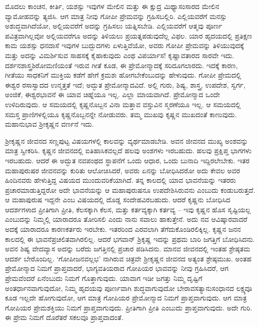 ಮೊದಲು ಕಾಂಚನ, ಕೀರ್ತಿ, ಯಶಸ್ಸು ಇವುಗಳ ಮೇಲಿನ ಮತ್ತು ಈ ಕ್ಷುದ್ರ ಮಿಥ್ಯಾಸಂಸಾರದ ಮೇಲಿನ ವ್ಯಾಮೋಹವನ್ನು ತ್ಯಜಿಸಿ. ಆಗ ಮಾತ್ರ ನೀವು ಗೋಪೀ ಪ್ರೇಮವನ್ನು ಗ್ರಹಿಸಬಲ್ಲಿರಿ. ಎಲ್ಲಿಯವರೆಗೆ ಮನಸ್ಸು ಅಶುದ್ಧವಾಗಿದೆಯೋ, ಅಲ್ಲಿಯವರೆಗೆ ಅದನ್ನು ಗ್ರಹಿಸಲು ಯತ್ನಿಸಬೇಡಿ. ಎಲ್ಲಿಯವರೆಗೆ ಆತ್ಮವು ಪೂರ್ಣ ಪವಿತ್ರವಾಗಿಲ್ಲವೋ ಅಲ್ಲಿಯವರೆಗೂ ಅದನ್ನು ತಿಳಿಯಲು ಪ್ರಯತ್ನಪಡುವುದೆಲ್ಲ ವಿಫಲ. ಯಾರ ಹೃದಯದಲ್ಲಿ ಪ್ರತಿಕ್ಷಣ ಕಾಮ ಯಶಸ್ಸು ಧನದಾಸೆ ಇವುಗಳ ಬುದ್ಬುದಗಳು ಏಳುತ್ತಿವೆಯೋ, ಅವರು ಗೋಪೀ ಪ್ರೇಮವನ್ನು ತಿಳಿಯುವುದಕ್ಕೆ ಮತ್ತು ಅದನ್ನು ವಿಮರ್ಶಿಸುವ ಸಾಹಸಕ್ಕೆ ಕೈಹಾಕುವುದು ಎಂಥ ವಿಪರ್ಯಾಸ! ಕೃಷ್ಣಾವತಾರದ ಸಾರವೇ ಇದು. ದರ್ಶನಶಾಸ್ತ್ರಶಿರೋಮಣಿಯಂತೆ ಇರುವ ಗೀತೆ ಕೂಡ, ಈ ಪ್ರೇಮೋನ್ಮಾದಕ್ಕೆ ಸರಿದೂಗಲಾರದು. ಇದಕ್ಕೆ ಕಾರಣ, ಗೀತೆಯು ಸಾಧಕನಿಗೆ ಮುಕ್ತಿಯ ಕಡೆಗೆ ಹೇಗೆ ಕ್ರಮಶಃ ಹೋಗಬೇಕೆಂಬುದನ್ನು ಹೇಳುವುದು. ಗೋಪೀ ಪ್ರೇಮದಲ್ಲಿ ಈಶ್ವರ ರಸಾಸ್ವಾದದ ಉನ್ಮತ್ತತೆ ಇದೆ; ಅದ್ಭುತ ಪ್ರೇಮೋನ್ಮಾದವಿದೆ. ಅಲ್ಲಿ ಗುರು, ಶಿಷ್ಯ, ಶಾಸ್ತ್ರ, ಉಪದೇಶ, ಸ್ವರ್ಗ, ಅಂಜಿಕೆ, ಈಶ್ವರಭಾವನೆ ಈ ಯಾವ ಚಿಹ್ನೆಯೂ ಇಲ್ಲ. ಎಲ್ಲಾ ಮಾಯವಾಗಿದೆ. ಪ್ರೇಮೋನ್ಮಾದ ಒಂದೇ ಉಳಿದಿರುವುದು. ಆ ಸಮಯದಲ್ಲಿ ಕೃಷ್ಣನೊಬ್ಬನ ವಿನಾ ಮತ್ತಾವ ವಸ್ತುವಿನ ಸ್ಮರಣೆಯೂ ಇಲ್ಲ. ಆ ಸಮಯದಲ್ಲಿ ಸಮಸ್ತ ಪ್ರಾಣಿಗಳಲ್ಲಿಯೂ ಕೃಷ್ಣನೊಬ್ಬನನ್ನೇ ನೋಡುವರು. ತಮ್ಮ ಮುಖವು ಕೃಷ್ಣನ ಮುಖದಂತೆ ಕಾಣುವುದು. ಮಹಾನುಭಾವ ಶ‍್ರೀಕೃಷ್ಣನ ವರ್ಣನೆ ಇದು.

ಶ‍್ರೀಕೃಷ್ಣನ ಜೀವನದ ಸಣ್ಣಪುಟ್ಟ ವಿಷಯಗಳಲ್ಲಿ ಕಾಲವನ್ನು ವ್ಯರ್ಥಮಾಡಬೇಡಿ. ಅವನ ಜೀವನದ ಮುಖ್ಯ ಅಂಶವನ್ನು ಮಾತ್ರ ಸ್ವೀಕರಿಸಿ. ಕೃಷ್ಣನ ಜೀವನದಲ್ಲಿ ಐತಿಹಾಸಿಕವಲ್ಲದೆ ಹಲವು ಅಂಶಗಳು ಇರಬಹುದು. ಹಲವು ಪ್ರಕ್ಷಿಪ್ತ ಭಾಗಗಳು ಇರಬಹುದು. ಆದರೆ ಈ ಅದ್ಭುತ ನವಪಂಥದ ಸ್ಥಾಪನೆಗೆ ಒಂದು ಆಧಾರ, ಒಂದು ಬುನಾದಿ ಇದ್ದಿರಲೇಬೇಕು. ಇತರ ಮಹಾಪುರುಷರ ಜೀವನವನ್ನು ಕುರಿತು ಆಲೋಚಿಸಿದರೆ, ಅವರು ಏನನ್ನು ಬೋಧಿಸಿದರೋ ಅದು ಕೇವಲ ಅವರ ಹಿಂದಿನವರು ಹೇಳುತ್ತಿದ್ದ ವಿಷಯದ ಮುಂದುವರಿಕೆಯಾಗಿದೆ. ತನ್ನ ಕಾಲದಲ್ಲಿ ಯಾವ ಭಾವನೆಯನ್ನು ಇತರರು ಪ್ರಚಾರಮಾಡುತ್ತಿದ್ದರೋ ಅದೇ ಭಾವನೆಯನ್ನು ಆ ಮಹಾಪುರುಷನೂ ಉಪದೇಶಿಸಿರುವನು ಎಂಬುದು ಕಂಡುಬರುತ್ತದೆ. ಆ ಮಹಾಪುರುಷ ಇದ್ದನೇ ಎಂಬ ವಿಷಯದಲ್ಲಿ ದೊಡ್ಡ ಸಂದೇಹವಿರಬಹುದು. ಆದರೆ ಕೃಷ್ಣನು ಬೋಧಿಸಿದ ಆದರ್ಶಗಳಾದ ಪ್ರೀತಿಗಾಗಿ ಪ್ರೀತಿ, ಕೆಲಸಕ್ಕಾಗಿ ಕೆಲಸ, ಮತ್ತು ಕರ್ತವ್ಯಕ್ಕಾಗಿ ಕರ್ತವ್ಯ – ಇವು ಕೃಷ್ಣನ ಹೊಸ ಸೃಷ್ಟಿಯಲ್ಲ ಎಂಬುದನ್ನು ನಿಮ್ಮಲ್ಲಿ ಯಾರಾದರೂ ತೋರಿಸಲಿ ಎಂದು ನಾನು ಸವಾಲು ಹಾಕುತ್ತೇನೆ. ಅದು ನವ ಆವಿಷ್ಕಾರವಾದರೆ ಅದಕ್ಕೆ ಯಾರಾದರೂ ಕಾರಣಕರ್ತರು ಇರಬೇಕು. ಇತರರಿಂದ ಎರವಲಾಗಿ ತೆಗೆದುಕೊಂಡಿರ\-ಲಿಕ್ಕಿಲ್ಲ. ಕೃಷ್ಣನ ಜನನ ಕಾಲದಲ್ಲಿ ಈ ಭಾವನೆಪ್ರಚಲಿತವಾಗಿರಲಿಲ್ಲ. ಆದರೆ ಭಗವಾನ್​ ಶ್ರಿಕೃಷ್ಣ ಇದನ್ನು ಪ್ರಥಮ ಬಾರಿ ಜಗತ್ತಿಗೆ ಬೋಧಿಸಿದನು. ಅವನ ಶಿಷ್ಯ ವೇದವ್ಯಾಸ ಅದನ್ನು ಬರೆದು ಜಗತ್ತಿನಲ್ಲಿ ಪ್ರಚಾರ ಪಡಿಸಿದನು. ಮಾನವ ಜೀವನದಲ್ಲಿ ಇಂತಹ ಶ್ರೇಷ್ಠತಮ ಆದರ್ಶ ಬೇರೊಂದಿಲ್ಲ. ‘ಗೋಪೀಜನವಲ್ಲಭ’ ನಾಗಿರುವ ಚಿತ್ರವೇ ಶ‍್ರೀಕೃಷ್ಣನ ಜೀವನದ ಅತ್ಯಂತ ಶ್ರೇಷ್ಠಮುಖ. ಅಂತಹ ಪ್ರೇಮೋನ್ಮಾದ ನಿಮಗೆ ಪ್ರಾಪ್ತವಾದರೆ, ಭಾಗ್ಯವತಿಯರಾದ ಗೋಪಿಯರ ಭಾವವನ್ನು ನೀವು ಗ್ರಹಿಸಿದರೆ, ಆಗ ಪ್ರೇಮವೆಂದರೆ ಏನೆಂಬುದು ನಿಮಗೆ ಗೊತ್ತಾಗುವುದು. ಯಾವಾಗ ಇಡೀ ಜಗತ್ತು ನಿಮ್ಮ ದೃಷ್ಟಿಗೆ ಅಂತರ್ಧಾನವಾಗುವುದೋ, ನಿಮ್ಮ ಹೃದಯವು ಪೂರ್ಣವಾಗಿ ಶುದ್ಧವಾಗುವುದೋ ಬೇರಾವ\break ಸತ್ಯಾನುಸಂಧಾನದ ಲಕ್ಷ್ಯವೂ ಕೂಡ ಇಲ್ಲದೇ ಹೋಗುವುದೋ, ಆಗ ಮಾತ್ರ ಗೋಪಿಯರ ಪ್ರೇಮೋನ್ಮಾದ ನಿಮಗೆ ಪ್ರಾಪ್ತವಾಗುವುದು. ಆಗ ಮಾತ್ರ ಗೋಪಿಯರ ಪ್ರೇಮಶಕ್ತಿಯು ನಿಮಗೆ ಪ್ರಾಪ್ತವಾಗುವುದು. ಪ್ರೀತಿಗಾಗಿ ಪ್ರೀತಿ ಎಂಬುದು ಪ್ರಾಪ್ತವಾಗುವುದು. ಅದೇ ಗುರಿ. ಈ ಪ್ರೇಮ ನಿಮಗೆ ದೊರೆತರೆ ಸಕಲವೂ ಪ್ರಾಪ್ತವಾದಂತೆ.

